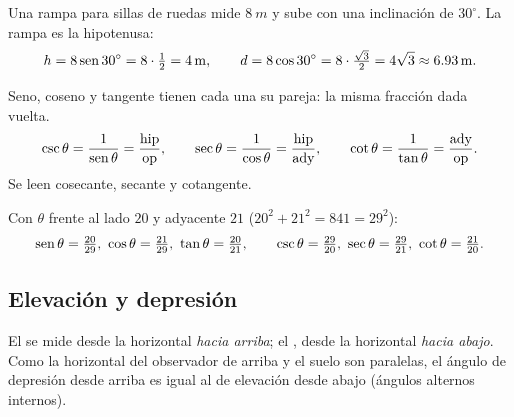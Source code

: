 \documentclass[11pt,a4paper]{article}
\let\nivelorig\nivel
\renewcommand{\nivel}[2]{\Needspace{8\baselineskip}\nivelorig{#1}{#2}}
\begin{document}
\begin{ejemplo}
Una rampa para sillas de ruedas mide $\SI{8}{m}$ y sube con una inclinación de $30^\circ$. La rampa es la hipotenusa:
\[ h=8\operatorname{sen}30^\circ=8\cdot\tfrac12=\SI{4}{m},\qquad d=8\cos30^\circ=8\cdot\tfrac{\sqrt3}{2}=4\sqrt3\approx\SI{6.93}{m}. \]
\end{ejemplo}


\begin{definicion}
Seno, coseno y tangente tienen cada una su pareja: la misma fracción dada vuelta.
\[ \csc\theta=\frac{1}{\operatorname{sen}\theta}=\frac{\text{hip}}{\text{op}},\qquad
   \sec\theta=\frac{1}{\cos\theta}=\frac{\text{hip}}{\text{ady}},\qquad
   \cot\theta=\frac{1}{\tan\theta}=\frac{\text{ady}}{\text{op}}. \]
Se leen cosecante, secante y cotangente.
\end{definicion}

\begin{ejemplo}[El triángulo $20$, $21$, $29$]
Con $\theta$ frente al lado $20$ y adyacente $21$ ($20^2+21^2=841=29^2$):
\[ \sen\theta=\tfrac{20}{29},\ \cos\theta=\tfrac{21}{29},\ \tan\theta=\tfrac{20}{21},\qquad
   \csc\theta=\tfrac{29}{20},\ \sec\theta=\tfrac{29}{21},\ \cot\theta=\tfrac{21}{20}. \]
\end{ejemplo}

\subsection{Elevación y depresión}
El  se mide desde la horizontal \emph{hacia arriba}; el , desde
la horizontal \emph{hacia abajo}. Como la horizontal del observador de arriba y el suelo son paralelas, el ángulo de
depresión desde arriba es igual al de elevación desde abajo (ángulos alternos internos).
\end{document}
